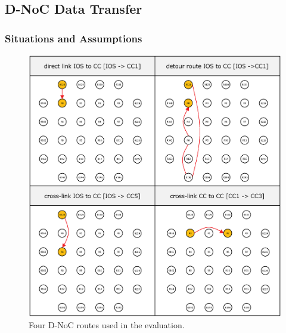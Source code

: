   \subsection{D-NoC Data Transfer}
  \label{sec:dnoc_eval}
  
  \subsubsection{Situations and Assumptions}
  \label{sec:situations_and_assumptions}
  
  \begin{figure}[t]
    \centering
    \includegraphics[width=0.9\linewidth]{../figure/noc_routes_old.eps}
        \caption{\label{fig:noc_routes}
      Four D-NoC routes used in the evaluation.}
  \end{figure}


